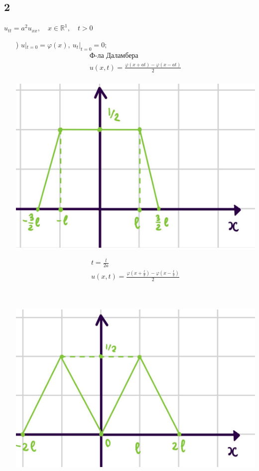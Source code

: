 \subsection{2}
$u_{tt}=a^{2}u_{xx}, \quad x \in \mathbb{R}^{1}, \quad t>0$ \\
\begin{enumerate}
  \item[\text{а})] $u|_{t=0}=\varphi(x), \ u_{t}|_{t=0}=0;$ \\
    \begin{gather*}
      \text{Ф-ла Даламбера} \\
      u(x,t) = \frac{\varphi(x+at)-\varphi(x-at)}{2} \\
    \end{gather*}
    \begin{minipage}{0.4\textwidth}
  \includegraphics[width=1\linewidth]{pictures/u4.jpg} 
    \end{minipage}
    \begin{minipage}{0.4\textwidth}\raggedleft
      \begin{gather*}
        t = \frac{l}{2a} \\
        u(x,t) = \frac{\varphi(x+ \frac{l}{2})- \varphi(x -\frac{l}{2})}{2} \\
      \end{gather*}
    \end{minipage} \\
    \begin{minipage}{0.4\textwidth}
  \includegraphics[width=1\linewidth]{pictures/u5.jpg} 

\end{minipage}
\end{enumerate}
